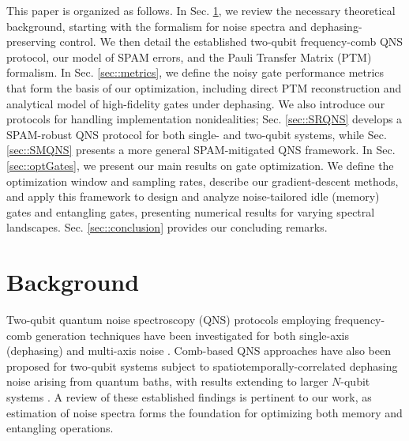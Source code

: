 \documentclass[%
 reprint,
superscriptaddress,
 amsmath,amssymb,
 aps,
pra,
]{revtex4-2}
\begin{document}
This paper is organized as follows. In Sec. \ref{sec::background}, we review the necessary theoretical background, starting with the formalism for noise spectra and dephasing-preserving control. We then detail the established two-qubit frequency-comb QNS protocol, our model of SPAM errors, and the Pauli Transfer Matrix (PTM) formalism. In Sec. \ref{sec::metrics}, we define the noisy gate performance metrics that form the basis of our optimization, including direct PTM reconstruction and analytical model of high-fidelity gates under dephasing. We also introduce our protocols for handling implementation nonidealities; Sec. \ref{sec::SRQNS} develops a SPAM-robust QNS protocol for both single- and two-qubit systems, while Sec. \ref{sec::SMQNS} presents a more general SPAM-mitigated QNS framework. In Sec. \ref{sec::optGates}, we present our main results on gate optimization. We define the optimization window and sampling rates, describe our gradient-descent methods, and apply this framework to design and analyze noise-tailored idle (memory) gates and entangling gates, presenting numerical results for varying spectral landscapes. Sec. \ref{sec::conclusion} provides our concluding remarks.


\section{Background}
\label{sec::background}
Two-qubit quantum noise spectroscopy (QNS) protocols employing frequency-comb generation techniques have been investigated for both single-axis (dephasing) and multi-axis noise \cite{PhysRevA.94.012109, PhysRevLett.107.230501, CombMultiaxis, PhysRevA.95.022121}. Comb-based QNS approaches have also been proposed for two-qubit systems subject to spatiotemporally-correlated dephasing noise arising from quantum baths, with results extending to larger $N$-qubit systems \cite{PhysRevA.95.022121}. A review of these established findings is pertinent to our work, as estimation of noise spectra forms the foundation for optimizing both memory and entangling operations.
\end{document}
